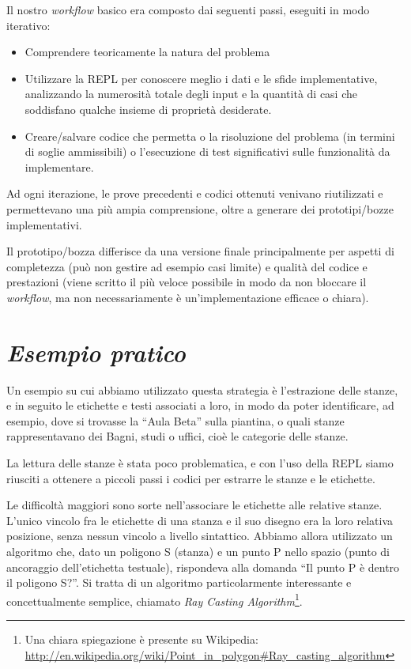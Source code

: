 \documentclass[12pt]{report}
\begin{document}
Il nostro \textit{workflow} basico era composto dai seguenti passi, eseguiti in modo iterativo:

\begin{itemize}
	\item Comprendere teoricamente la natura del problema
	\item Utilizzare la REPL per conoscere meglio i dati e le sfide implementative, analizzando la numerosità totale degli input e la quantità di casi che soddisfano  qualche insieme di proprietà desiderate.
	\item Creare/salvare codice che permetta o la risoluzione del problema (in termini di soglie ammissibili) o l'esecuzione di test significativi sulle funzionalità da implementare.
\end{itemize}

Ad ogni iterazione, le prove precedenti e codici ottenuti venivano riutilizzati e permettevano una più ampia comprensione, oltre a generare dei prototipi/bozze implementativi.

Il prototipo/bozza differisce da una versione finale principalmente per aspetti di completezza (può non gestire ad esempio casi limite) e qualità del codice e prestazioni (viene scritto il più veloce possibile in modo da non bloccare il \textit{workflow}, ma non necessariamente è un'implementazione efficace o chiara).

\section*{\textit{Esempio pratico}}

Un esempio su cui abbiamo utilizzato questa strategia è l'estrazione delle stanze, e in seguito le etichette e testi associati a loro, in modo da poter identificare, ad esempio, dove si trovasse la ``Aula Beta'' sulla piantina, o quali stanze rappresentavano dei Bagni, studi o uffici, cioè le categorie delle stanze.

La lettura delle stanze è stata poco problematica, e con l'uso della REPL siamo riusciti a ottenere a piccoli passi i codici per estrarre le stanze e le etichette.

Le difficoltà maggiori sono sorte nell'associare le etichette alle relative stanze. L'unico vincolo fra le etichette di una stanza e il suo disegno era la loro relativa posizione, senza nessun vincolo a livello sintattico. Abbiamo allora utilizzato un algoritmo che, dato un poligono S (stanza) e un punto P nello spazio (punto di ancoraggio dell'etichetta testuale), rispondeva alla domanda ``Il punto P è dentro il poligono S?''. Si tratta di un algoritmo particolarmente interessante e concettualmente semplice, chiamato \textit{Ray Casting Algorithm}\footnote{Una chiara spiegazione è presente su Wikipedia: \url{http://en.wikipedia.org/wiki/Point_in_polygon\#Ray_casting_algorithm}}.
\end{document}
